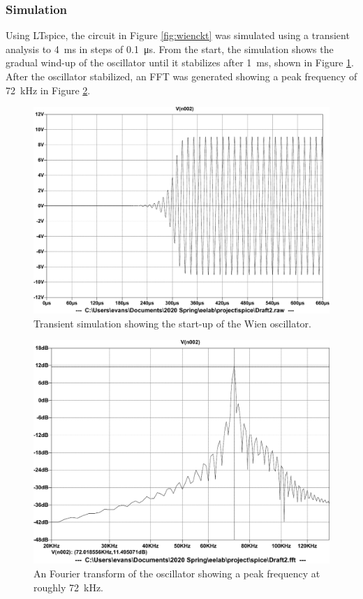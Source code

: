 \documentclass[11pt,letter,notitlepage]{article}
\begin{document}
	\subsubsection{Simulation}
	Using LTspice, the circuit in Figure \ref{fig:wienckt} was simulated using a transient analysis to \SI{4}{\ms} in steps of \SI{0.1}{\us}. From the start, the simulation shows the gradual wind-up of the oscillator until it stabilizes after \SI{1}{\ms}, shown in Figure \ref{fig:wiensimt-crop}. After the oscillator stabilized, an FFT was generated showing a peak frequency of \SI{72}{\kHz} in Figure \ref{fig:wiensimfft-crop}.
		\vspace{-1em}
	\begin{figure}[h]
		\centering
		\includegraphics[width=0.6\linewidth,clip,trim=0 1.2em 0 0.9em]{wien/wien_simt-crop}
		\vspace{-0.5em}
		\caption{Transient simulation showing the start-up of the Wien oscillator.}
		\label{fig:wiensimt-crop}
	\end{figure}
	\vspace{-1.5em}
	\begin{figure}[h]
		\centering
		\includegraphics[width=0.6\linewidth,clip,trim=0 1.3em 0 0.9em]{wien/wien_simfft-crop}
		\vspace{-1em}
		\caption{An Fourier transform of the oscillator showing a peak frequency at roughly \SI{72}{\kHz}.}
		\label{fig:wiensimfft-crop}
	\end{figure}
\end{document}
